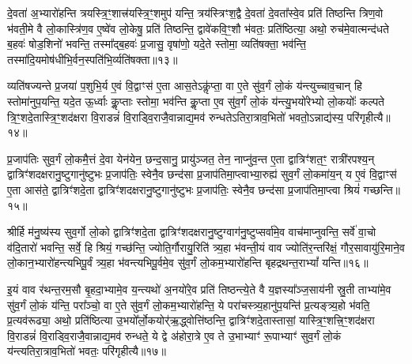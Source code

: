 दे॒वता॑ अ॒भ्यारो॑हन्ति त्रयस्त्रि॒ꣳ॒शात्त्र॑यस्त्रि॒ꣳ॒शमुप॑ यन्ति॒ त्रय॑स्त्रिꣳश॒द्वै दे॒वता॑ दे॒वता᳚स्वे॒व प्रति॑ तिष्ठन्ति त्रिण॒वो भ॑वती॒मे वै लो॒कास्त्रि॑ण॒व ए॒ष्वे॑व लो॒केषु॒ प्रति॑ तिष्ठन्ति॒ द्वावे॑कवि॒ꣳ॒शौ भ॑वतः॒ प्रति॑ष्ठित्या॒ अथो॒ रुच॑मे॒वात्मन्द॑धते ब॒हवः॑ षोड॒शिनो॑ भवन्ति॒ तस्मा᳚द्ब॒हवः॑ प्र॒जासु॒ वृषा॑णो॒ यदे॒ते स्तोमा॒ व्यति॑षक्ता॒ भव॑न्ति॒ तस्मा॑दि॒यमोष॑धीभि॒र्वन॒स्पति॑भि॒र्व्यति॑षक्ता॥१३॥

व्यति॑षज्यन्ते प्र॒जया॑ प॒शुभि॒र्य ए॒वं वि॒द्वाꣳस॑ ए॒ता आस॒ते\-ऽकॢ॑प्ता॒ वा ए॒ते सु॑व॒र्गं लो॒कं य॑न्त्युच्चाव॒चान् हि स्तोमा॑नुप॒यन्ति॒ यदे॒त ऊ॒र्ध्वाः कॢ॒प्ताः स्तोमा॒ भव॑न्ति कॢ॒प्ता ए॒व सु॑व॒र्गं लो॒कं य॑न्त्यु॒भयो॑रेभ्यो लो॒कयोः᳚ कल्पते त्रि॒ꣳ॒शदे॒तास्त्रि॒ꣳ॒शद॑क्षरा वि॒राडन्नं॑ वि॒राड्वि॒राजै॒वान्नाद्य॒मव॑ रुन्धते\-ऽतिरा॒त्राव॒भितो॑ भवतो॒\-ऽन्नाद्य॑स्य॒ परि॑गृहीत्यै॥१४॥

{\anuvakamend[{ओष॑धीः सं वथ्स॒र ए॒वाव॑ प्रति॒ष्ठाय॒ व्यति॑ष॒क्तैका॒न्नप॑ञ्चा॒शच्च॑॥३॥}]}

प्र॒जाप॑तिः सुव॒र्गं लो॒कमै॒त्तं दे॒वा येन॑येन॒ छन्द॒सानु॒ प्रायु॑ञ्जत॒ तेन॒ नाप्नु॑व॒न्त ए॒ता द्वात्रिꣳ॑शत॒ꣳ॒ रात्री॑रपश्य॒न् द्वात्रिꣳ॑शदक्षरानु॒ष्टुगानु॑ष्टुभः प्र॒जाप॑तिः॒ स्वेनै॒व छन्द॑सा प्र॒जाप॑तिमा॒प्त्वाभ्या॒रुह्य॑ सुव॒र्गं लो॒कमा॑य॒न् य ए॒वं वि॒द्वाꣳस॑ ए॒ता आस॑ते॒ द्वात्रिꣳ॑शदे॒ता द्वात्रिꣳ॑शदक्षरानु॒ष्टुगानु॑ष्टुभः प्र॒जाप॑तिः॒ स्वेनै॒व छन्द॑सा प्र॒जाप॑तिमा॒प्त्वा श्रियं॑ गच्छन्ति॥१५॥

श्रीर्\mbox{}हि म॑नु॒ष्य॑स्य सुव॒र्गो लो॒को द्वात्रिꣳ॑शदे॒ता द्वात्रिꣳ॑शदक्षरानु॒ष्टुग्वाग॑नु॒ष्टुप्सर्वा॑मे॒व वाच॑माप्नुवन्ति॒ सर्वे॑ वा॒चो व॑दि॒तारो॑ भवन्ति॒ सर्वे॒ हि श्रियं॒ गच्छ॑न्ति॒ ज्योति॒र्गौरायु॒रिति॑ त्र्य॒हा भ॑वन्ती॒यं वाव ज्योति॑र॒न्तरि॑क्षं॒ गौर॒सावायु॑\-रि॒माने॒व लो॒कान॒भ्यारो॑हन्त्यभिपू॒र्वं त्र्य॒हा भ॑वन्त्यभिपू॒र्वमे॒व सु॑व॒र्गं लो॒कम॒भ्यारो॑हन्ति बृहद्रथन्त॒रा\-भ्यां᳚ यन्ति॥१६॥

इ॒यं वाव र॑थन्त॒रम॒सौ बृ॒हदा॒भ्यामे॒व य॒न्त्यथो॑ अ॒नयो॑रे॒व प्रति॑ तिष्ठन्त्ये॒ते वै य॒ज्ञस्या᳚ञ्ज॒साय॑नी स्रु॒ती ताभ्या॑मे॒व सु॑व॒र्गं लो॒कं य॑न्ति॒ परा᳚ञ्चो॒ वा ए॒ते सु॑व॒र्गं लो॒कम॒भ्यारो॑हन्ति॒ ये परा॑चस्त्र्य॒हानु॑प॒यन्ति॑ प्र॒त्यङ्त्र्य॒हो भ॑वति॒ प्र॒त्यव॑रूढ्या॒ अथो॒ प्रति॑ष्ठित्या उ॒भयो᳚र्लो॒कयोर्\mbox{}॑ऋ॒द्ध्वोत्ति॑ष्ठन्ति॒ द्वात्रिꣳ॑शदे॒तास्तासां॒ यास्त्रि॒ꣳ॒शत्त्रि॒ꣳ॒शद॑क्षरा वि॒राडन्नं॑ वि॒राड्वि॒राजै॒वान्नाद्य॒मव॑ रुन्धते॒ ये द्वे अ॑होरा॒त्रे ए॒व ते उ॒भाभ्याꣳ॑ रू॒पाभ्याꣳ॑ सुव॒र्गं लो॒कं य॑न्त्यतिरा॒त्राव॒भितो॑ भवतः॒ परि॑गृहीत्यै॥१७॥

{\anuvakamend[{ग॒च्छ॒न्ति॒ य॒न्ति॒ त्रि॒ꣳ॒शद॑क्षरा॒ द्वाविꣳ॑शतिश्च॥४॥}]}

